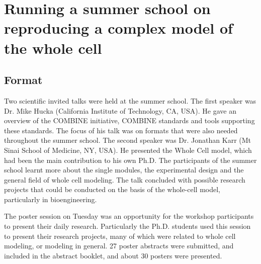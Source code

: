 \documentclass[journal,transmag]{IEEEtran}
\begin{document}
\section{Running a summer school on reproducing a complex model of the whole cell}

\subsection{Format}
Two scientific invited talks were held at the summer school. 
The first speaker was Dr. Mike Hucka (California Institute of Technology, CA, USA). 
He gave an overview of the COMBINE initiative, COMBINE standards and tools supporting these standards. 
The focus of his talk was on formats that were also needed throughout the summer school. 
The second speaker was Dr. Jonathan Karr (Mt Sinai School of Medicine, NY, USA). 
He presented the Whole Cell model, which had been the main contribution to his own Ph.D. 
The participants of the summer school learnt more about the single modules, the experimental design and the general field of whole cell modeling. The talk concluded with possible research projects that could be conducted on the basis of the whole-cell model, particularly in bioengineering. 

The poster session on Tuesday was an opportunity for the workshop participants to present their daily research. 
Particularly the Ph.D. students used this session to present their research projects, many of which were related to whole cell modeling, or modeling in general. 
27 poster abstracts were submitted, and included in the abstract booklet, and about 30 posters were presented.
\end{document}
